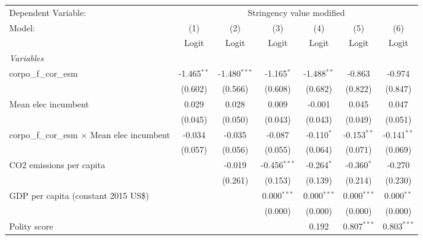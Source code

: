 
\begingroup
\centering
\begin{tabular}{lcccccc}
   \toprule
   Dependent Variable: & \multicolumn{6}{c}{Stringency value modified}\\
   Model:                                              & (1)           & (2)            & (3)            & (4)           & (5)           & (6)\\  
                                                       &  Logit        & Logit          & Logit          & Logit         & Logit         & Logit\\  
   \midrule
   \emph{Variables}\\
   corpo\_f\_cor\_esm                                  & -1.465$^{**}$ & -1.480$^{***}$ & -1.165$^{*}$   & -1.488$^{**}$ & -0.863        & -0.974\\   
                                                       & (0.602)       & (0.566)        & (0.608)        & (0.682)       & (0.822)       & (0.847)\\   
   Mean elec incumbent                                 & 0.029         & 0.028          & 0.009          & -0.001        & 0.045         & 0.047\\   
                                                       & (0.045)       & (0.050)        & (0.043)        & (0.043)       & (0.049)       & (0.051)\\   
   corpo\_f\_cor\_esm $\times$ Mean elec incumbent     & -0.034        & -0.035         & -0.087         & -0.110$^{*}$  & -0.153$^{**}$ & -0.141$^{**}$\\   
                                                       & (0.057)       & (0.056)        & (0.055)        & (0.064)       & (0.071)       & (0.069)\\   
   CO2 emissions per capita                            &               & -0.019         & -0.456$^{***}$ & -0.264$^{*}$  & -0.360$^{*}$  & -0.270\\   
                                                       &               & (0.261)        & (0.153)        & (0.139)       & (0.214)       & (0.230)\\   
   GDP per capita (constant 2015 US\$)                 &               &                & 0.000$^{***}$  & 0.000$^{***}$ & 0.000$^{***}$ & 0.000$^{**}$\\   
                                                       &               &                & (0.000)        & (0.000)       & (0.000)       & (0.000)\\   
   Polity score                                        &               &                &                & 0.192         & 0.807$^{***}$ & 0.803$^{***}$\\   

\end{tabular}
